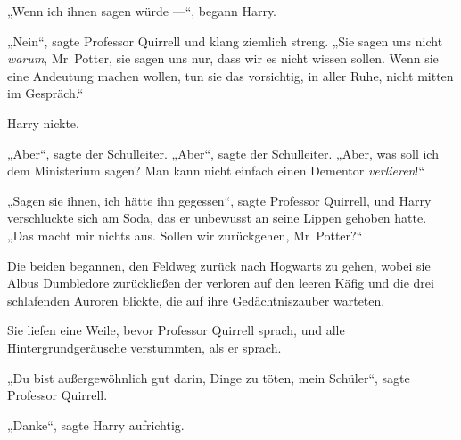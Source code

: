 „Wenn ich ihnen sagen würde —“, begann Harry.

„Nein“, sagte Professor Quirrell und klang ziemlich streng.
„Sie sagen uns nicht \emph{warum}, Mr~Potter, sie sagen uns nur, dass wir es nicht wissen sollen. Wenn sie eine Andeutung machen wollen, tun sie das vorsichtig, in aller Ruhe, nicht mitten im Gespräch.“

Harry nickte.

„Aber“, sagte der Schulleiter.
„Aber“, sagte der Schulleiter.
„Aber, was soll ich dem Ministerium sagen? Man kann nicht einfach einen Dementor \emph{verlieren}!“

„Sagen sie ihnen, ich hätte ihn gegessen“, sagte Professor Quirrell, und Harry verschluckte sich am Soda, das er unbewusst an seine Lippen gehoben hatte.
„Das macht mir nichts aus. Sollen wir zurückgehen, Mr~Potter?“

Die beiden begannen, den Feldweg zurück nach Hogwarts zu gehen, wobei sie Albus Dumbledore zurückließen der verloren auf den leeren Käfig und die drei schlafenden Auroren blickte, die auf ihre Gedächtniszauber warteten.


Sie liefen eine Weile, bevor Professor Quirrell sprach, und alle Hintergrundgeräusche verstummten, als er sprach.

„Du bist außergewöhnlich gut darin, Dinge zu töten, mein Schüler“, sagte Professor Quirrell.

„Danke“, sagte Harry aufrichtig.

